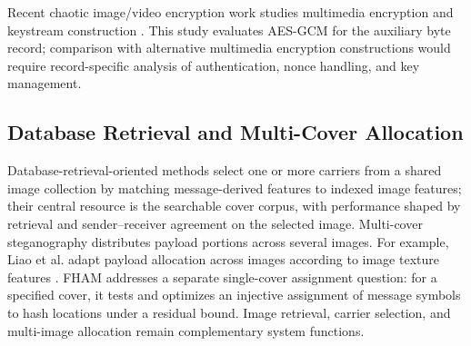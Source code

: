 \documentclass[preprint,12pt]{elsarticle}
\theoremstyle{plain}
\providecommand{\DIFaddtex}[1]{{\protect\color{blue} \sf #1}} %
\providecommand{\DIFdeltex}[1]{{\protect\color{red} \scriptsize #1}} %
\providecommand{\DIFaddbegin}{} %
\providecommand{\DIFaddend}{} %
\providecommand{\DIFdelbegin}{} %
\providecommand{\DIFdelend}{} %
\providecommand{\DIFadd}[1]{\texorpdfstring{\DIFaddtex{#1}}{#1}} %
\providecommand{\DIFdel}[1]{\texorpdfstring{\DIFdeltex{#1}}{}} %
\providecommand{\DIFscaledelfig}{0.5}
\newlength{\DIFdelgraphicswidth} %
\newlength{\DIFdelgraphicsheight} %
\providecommand{\DIFaddincludegraphics}[2][]{{\color{blue}\fbox{\DIFOincludegraphics[#1]{#2}}}} %
\providecommand{\DIFdelincludegraphics}[2][]{%
\sbox{\DIFdelgraphicsbox}{\DIFOincludegraphics[#1]{#2}}%
\settoboxwidth{\DIFdelgraphicswidth}{\DIFdelgraphicsbox} %
\settoboxtotalheight{\DIFdelgraphicsheight}{\DIFdelgraphicsbox} %
\scalebox{\DIFscaledelfig}{%
\parbox[b]{\DIFdelgraphicswidth}{\usebox{\DIFdelgraphicsbox}\\[-\baselineskip] \rule{\DIFdelgraphicswidth}{0em}}\llap{\resizebox{\DIFdelgraphicswidth}{\DIFdelgraphicsheight}{%
\setlength{\unitlength}{\DIFdelgraphicswidth}%
\begin{picture}(1,1)%
\thicklines\linethickness{2pt} %
{\color[rgb]{1,0,0}\put(0,0){\framebox(1,1){}}}%
{\color[rgb]{1,0,0}\put(0,0){\line( 1,1){1}}}%
{\color[rgb]{1,0,0}\put(0,1){\line(1,-1){1}}}%
\end{picture}%
}\hspace*{3pt}}} %
} %
\DeclareRobustCommand{\DIFaddbegin}{\DIFOaddbegin \let\includegraphics\DIFaddincludegraphics} %
\DeclareRobustCommand{\DIFaddend}{\DIFOaddend \let\includegraphics\DIFOincludegraphics} %
\DeclareRobustCommand{\DIFdelbegin}{\DIFOdelbegin \let\includegraphics\DIFdelincludegraphics} %
\DeclareRobustCommand{\DIFdelend}{\DIFOaddend \let\includegraphics\DIFOincludegraphics} %
\renewcommand{\DIFdel}[1]{}
\renewcommand{\DIFdelincludegraphics}[2][]{}
\begin{document}
\DIFdelbegin \DIFdel{Watermarking and forensic methods address related but distinct signal models.
Screen-shooting watermarking methods recover an embedded signal after capture
or display transformations \cite{fu2025waverecovery,li2024screenshooting}; FAMM detects compressed deepfake video from facial-motion features
\cite{liao2023famm}, while orthogonal-moment watermarking supports proactive
deepfake detection \cite{wang2026orthowatermark}. These works provide
context for robust recovery and forensic detection; FHAM
's evaluated architecture
pairs an unchanged cover with an external encrypted record.

}\DIFdelend Recent chaotic
image/video encryption work studies multimedia encryption and keystream
construction \cite{gao2025memristive,gao2025story,gao2025chaosreview}.
This study evaluates AES-GCM for the auxiliary byte record; \DIFaddbegin \DIFadd{comparison with
}\DIFaddend alternative multimedia encryption constructions \DIFdelbegin \DIFdel{call for }\DIFdelend \DIFaddbegin \DIFadd{would require }\DIFaddend record-specific
\DIFdelbegin \DIFdel{comparison }\DIFdelend \DIFaddbegin \DIFadd{analysis }\DIFaddend of authentication, nonce handling, and key management.

\subsection{Database Retrieval and Multi-Cover Allocation}
Database-retrieval-oriented methods select one or more carriers from a shared
image collection by matching message-derived features to indexed image
features; their central resource is the searchable cover corpus, with
performance shaped by retrieval and sender--receiver agreement on the selected
image. Multi-cover steganography distributes payload portions across several
images. For example, Liao et al. adapt payload allocation across images
according to image texture features \cite{liao2022adaptivepayload}. FHAM
addresses a separate single-cover assignment question: for a specified cover,
it tests and optimizes an injective assignment of message symbols to hash
locations under a residual bound. Image retrieval, carrier selection, and
multi-image allocation remain complementary system functions.
\end{document}
